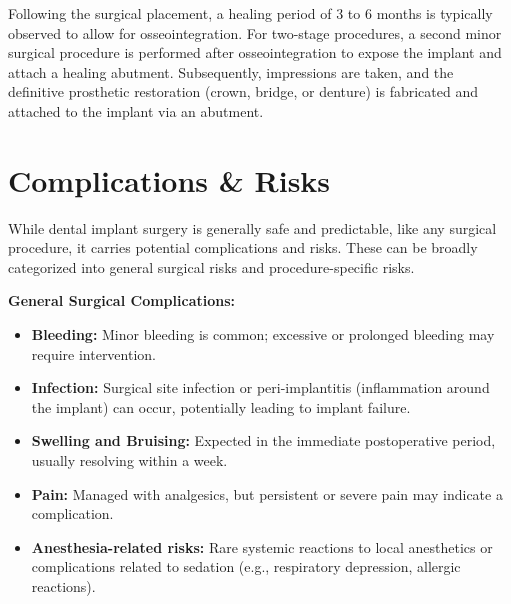 Following the surgical placement, a healing period of 3 to 6 months is typically observed to allow for osseointegration. For two-stage procedures, a second minor surgical procedure is performed after osseointegration to expose the implant and attach a healing abutment. Subsequently, impressions are taken, and the definitive prosthetic restoration (crown, bridge, or denture) is fabricated and attached to the implant via an abutment.

\section*{Complications \& Risks}
While dental implant surgery is generally safe and predictable, like any surgical procedure, it carries potential complications and risks. These can be broadly categorized into general surgical risks and procedure-specific risks.

\textbf{General Surgical Complications:}
\begin{itemize}
  \item \textbf{Bleeding:} Minor bleeding is common; excessive or prolonged bleeding may require intervention.
  \item \textbf{Infection:} Surgical site infection or peri-implantitis (inflammation around the implant) can occur, potentially leading to implant failure.
  \item \textbf{Swelling and Bruising:} Expected in the immediate postoperative period, usually resolving within a week.
  \item \textbf{Pain:} Managed with analgesics, but persistent or severe pain may indicate a complication.
  \item \textbf{Anesthesia-related risks:} Rare systemic reactions to local anesthetics or complications related to sedation (e.g., respiratory depression, allergic reactions).
\end{itemize}

